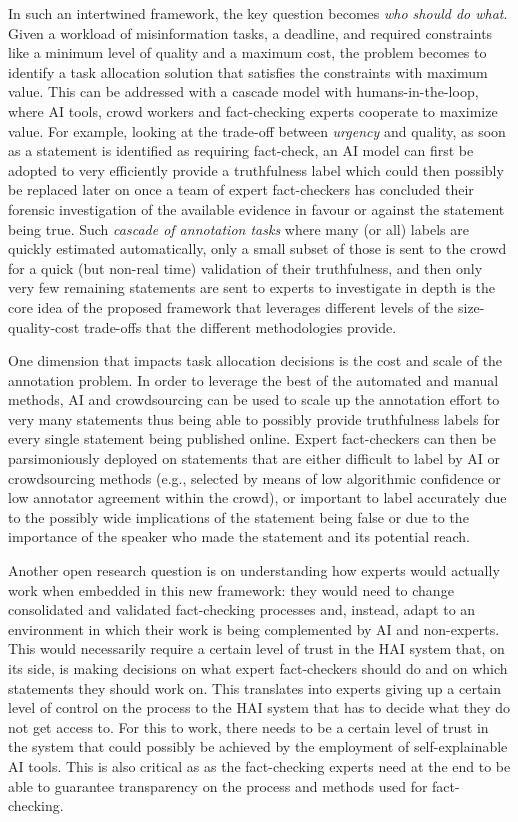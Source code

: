 \documentclass[11pt]{article}
\begin{document}
In such an intertwined framework, the key question becomes \textit{who should do what}. Given a workload of misinformation tasks, a deadline, and required constraints like a minimum level of quality and a maximum cost, the problem becomes to identify a task allocation solution that satisfies the constraints with maximum value.
This can be addressed with a cascade model \cite{viola2001rapid,weiss2010structured,wang2011cascade} with humans-in-the-loop, where AI tools, crowd workers and fact-checking experts cooperate to maximize value.
% 
For example, looking at the trade-off between \textit{urgency} and quality, as soon as a statement is identified as requiring fact-check, an AI model can first be adopted to very efficiently provide a truthfulness label which could then possibly be replaced later on once a team of expert fact-checkers has concluded their forensic investigation of the available evidence in favour or against the statement being true.
Such \textit{cascade of annotation tasks} where many (or all) labels are quickly estimated automatically, only a small subset of those is sent to the crowd for a quick (but non-real time) validation of their truthfulness, and then only very few remaining statements are sent to experts to investigate in depth is the core idea of the proposed framework that leverages different levels of the size-quality-cost trade-offs that the different methodologies provide.

One dimension that impacts  task allocation decisions is the cost and scale of the annotation problem. In order to leverage the best of the automated and manual methods, AI and crowdsourcing can be used to scale up the annotation effort to very many statements thus being able to possibly provide truthfulness labels for every single statement being published online. Expert fact-checkers can then be parsimoniously deployed on statements that are either difficult to label by AI or crowdsourcing methods (e.g., selected by means of low algorithmic confidence or low annotator agreement within the crowd), or important to label accurately due to the possibly wide implications of the statement being false or due to the importance of the speaker who made the statement and its potential reach.

Another open research question is on understanding how experts would actually work when embedded in this new framework: they would need to change consolidated and validated fact-checking processes and, instead,  adapt to an environment in which their work is being complemented by AI and non-experts. This would necessarily require a certain level of trust in the HAI system that, on its side, is making  decisions on what expert fact-checkers should do and on which statements they should work on. This translates into experts giving up a certain level of control on the process to the HAI system that has to decide what they do not get access to. 
For this to work, there needs to be a certain level of trust in the system that could possibly be achieved by the employment of self-explainable AI tools. This is also critical as as the fact-checking experts need at the end to be able to guarantee transparency on the process and methods used for fact-checking.
\end{document}

